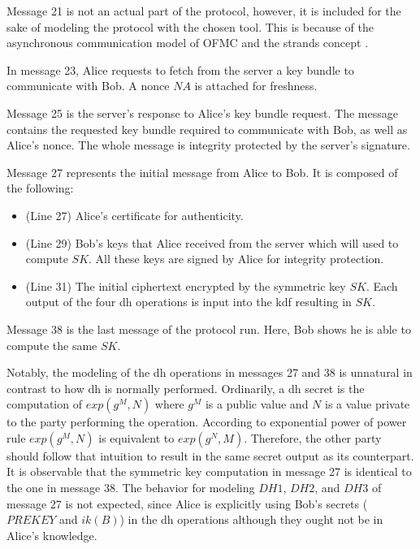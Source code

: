 \par
Message 21 is not an actual part of the protocol, however, it is included for the sake of modeling the protocol with the chosen tool. This is because of the asynchronous communication model of OFMC and the strands concept \cite{ofmcTut}.
\par 
In message 23, Alice requests to fetch from the server a key bundle to communicate with Bob. A nonce $NA$ is attached for freshness.
\par
Message 25 is the server's response to Alice's key bundle request. The message contains the requested key bundle required to communicate with Bob, as well as Alice's nonce. The whole message is integrity protected by the server's signature.
\par
Message 27 represents the initial message from Alice to Bob. It is composed of the following:
\begin{itemize}
	\item (Line 27) Alice's certificate for authenticity.
	\item (Line 29) Bob's keys that Alice received from the server which will used to compute $SK$. All these keys are signed by Alice for integrity protection.
	\item (Line 31) The initial ciphertext encrypted by the symmetric key $SK$. Each output of the four \gls{dh} operations is input into the \gls{kdf} resulting in $SK$.
\end{itemize}
Message 38 is the last message of the protocol run. Here, Bob shows he is able to compute the same $SK$. 
\par
Notably, the modeling of the \gls{dh} operations in messages 27 and 38 is unnatural in contrast to how \gls{dh} is normally performed. Ordinarily, a \gls{dh} secret is the computation of $exp(g^{M},N)$ where $g^{M}$ is a public value and $N$ is a value private to the party performing the operation. According to exponential power of power rule $exp(g^{M},N)$ is equivalent to $exp(g^{N},M)$. Therefore, the other party should follow that intuition to result in the same secret output as its counterpart. 
It is observable that the symmetric key computation in message 27 is identical to the one in message 38.
The behavior for modeling $DH1$, $DH2$, and $DH3$ of message 27 is not expected, since Alice is explicitly using Bob's secrets ($PREKEY$ and $ik(B)$) in the \gls{dh} operations although they ought not be in Alice's knowledge.

